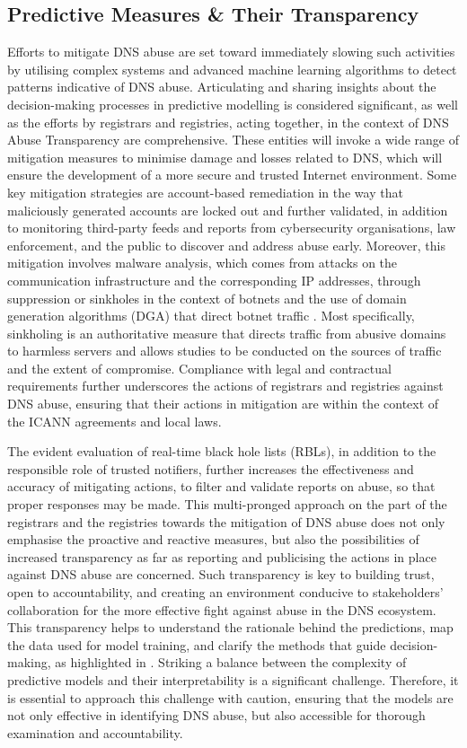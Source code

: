 \subsection{Predictive Measures \& Their Transparency}

Efforts to mitigate DNS abuse are set toward immediately slowing such activities by utilising complex systems and advanced machine learning algorithms to detect patterns indicative of DNS abuse. Articulating and sharing insights about the decision-making processes in predictive modelling is considered significant, as well as the efforts by registrars and registries, acting together, in the context of DNS Abuse Transparency are comprehensive. These entities will invoke a wide range of mitigation measures to minimise damage and losses related to DNS, which will ensure the development of a more secure and trusted Internet environment. Some key mitigation strategies are account-based remediation in the way that maliciously generated accounts are locked out and further validated, in addition to monitoring third-party feeds and reports from cybersecurity organisations, law enforcement, and the public to discover and address abuse early. Moreover, this mitigation involves malware analysis, which comes from attacks on the communication infrastructure and the corresponding IP addresses, through suppression or sinkholes in the context of botnets and the use of domain generation algorithms (DGA) that direct botnet traffic \cite{ M3AAWG2024}. Most specifically, sinkholing is an authoritative measure that directs traffic from abusive domains to harmless servers and allows studies to be conducted on the sources of traffic and the extent of compromise. Compliance with legal and contractual requirements further underscores the actions of registrars and registries against DNS abuse, ensuring that their actions in mitigation are within the context of the ICANN agreements and local laws. 

The evident evaluation of real-time black hole lists (RBLs), in addition to the responsible role of trusted notifiers, further increases the effectiveness and accuracy of mitigating actions, to filter and validate reports on abuse, so that proper responses may be made. This multi-pronged approach on the part of the registrars and the registries towards the mitigation of DNS abuse does not only emphasise the proactive and reactive measures, but also the possibilities of increased transparency as far as reporting and publicising the actions in place against DNS abuse are concerned. Such transparency is key to building trust, open to accountability, and creating an environment conducive to stakeholders' collaboration for the more effective fight against abuse in the DNS ecosystem. This transparency helps to understand the rationale behind the predictions, map the data used for model training, and clarify the methods that guide decision-making, as highlighted in \cite{hussain2022software}. Striking a balance between the complexity of predictive models and their interpretability is a significant challenge. Therefore, it is essential to approach this challenge with caution, ensuring that the models are not only effective in identifying DNS abuse, but also accessible for thorough examination and accountability.


